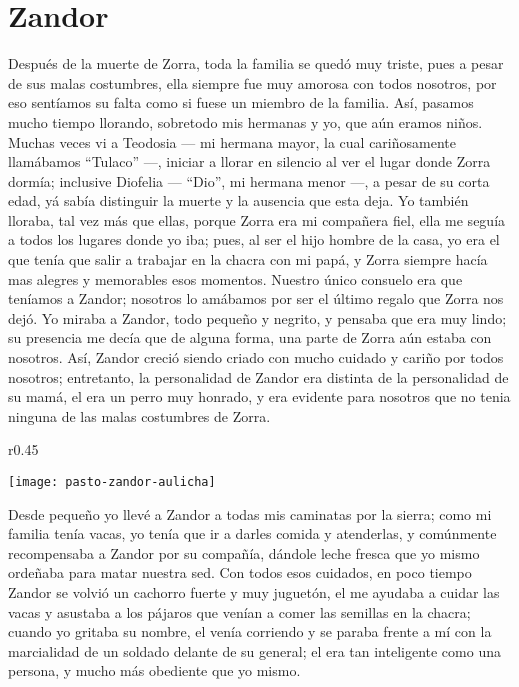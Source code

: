 \cleardoublepage
\newpage
{}
\chapter{Zandor}
Después de la muerte de Zorra, toda la familia se quedó muy triste, pues a pesar de sus malas costumbres, ella siempre fue muy amorosa con todos nosotros, por eso sentíamos su falta como si fuese un miembro de la familia.
Así, pasamos mucho tiempo llorando, sobretodo mis hermanas y yo, que aún eramos niños.
Muchas veces vi a Teodosia --- mi hermana mayor, la cual cariñosamente llamábamos ``Tulaco'' ---, iniciar a llorar en silencio al ver el lugar donde Zorra dormía; inclusive Diofelia --- ``Dio'', mi hermana menor ---, a pesar de su corta edad, yá sabía distinguir la muerte y la ausencia que esta deja.
Yo también lloraba, tal vez más que ellas, porque Zorra era mi compañera fiel, ella me seguía a todos los lugares donde yo iba; pues, al ser el hijo hombre de la casa, yo era el que tenía que salir a trabajar en la chacra con mi papá, y Zorra siempre hacía mas alegres y memorables esos momentos.
Nuestro único consuelo era que teníamos a Zandor; nosotros lo amábamos por ser el último regalo que Zorra nos dejó.
Yo miraba a Zandor, todo pequeño y negrito, y pensaba que era muy lindo; su presencia me decía que de alguna forma, una parte de Zorra aún estaba con nosotros.
Así, Zandor creció siendo criado con mucho cuidado y cariño por todos nosotros;
entretanto, la personalidad de Zandor era distinta de la personalidad de su mamá, el era un perro muy honrado, y era evidente para nosotros que no tenia ninguna de las malas costumbres de Zorra.
\begin{wrapfigure}{r}{0.45\textwidth}
  \begin{center}
  \vspace{-20pt}
    \texttt{[image: pasto-zandor-aulicha]}
  \end{center}
  \vspace{-20pt}
\end{wrapfigure}
Desde pequeño yo llevé a Zandor a todas mis caminatas por la sierra; como mi familia tenía vacas, yo tenía que ir a darles comida y atenderlas, y comúnmente recompensaba a Zandor por su compañía, dándole leche fresca que yo mismo ordeñaba para matar nuestra sed.
Con todos esos cuidados, en poco tiempo Zandor se volvió un cachorro fuerte y muy juguetón,
el me ayudaba a cuidar las vacas y asustaba a los pájaros que venían a comer las semillas en la chacra; cuando yo gritaba su nombre, el venía corriendo y se paraba frente a mí con la marcialidad de un soldado delante de su general; el era tan inteligente como una persona, y mucho más obediente que yo mismo.

